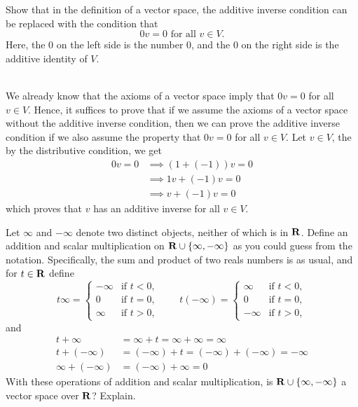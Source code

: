 \begin{exercise}
    Show that in the definition of a vector space, the additive inverse condition can be replaced with the condition that
    $$0v = 0 \text{ for all } v\in V.$$
    Here, the 0 on the left side is the number 0, and the 0 on the right side is the additive identity of $V$.\\
\end{exercise}

\begin{solution}
    \\ We already know that the axioms of a vector space imply that $0v = 0$ for all $v \in V$. Hence, it suffices to prove that if we assume the axioms of a vector space without the additive inverse condition, then we can prove the additive inverse condition if we also assume the property that $0v = 0$ for all $v \in V$. Let $v \in V$, the by the distributive condition, we get
    \begin{align*}
        0v = 0 &\implies (1 + (-1))v = 0 \\
        &\implies 1v + (-1)v = 0 \\
        &\implies v + (-1)v = 0
    \end{align*}
    which proves that $v$ has an additive inverse for all $v \in V$.\\
\end{solution}

\begin{exercise}
    Let $\infty$ and $-\infty$ denote two distinct objects, neither of which is in $\mathbf{R}$. Define an addition and scalar multiplication on $\mathbf{R} \cup \{\infty, -\infty\}$ as you could guess from the notation. Specifically, the sum and product of two reals numbers is as usual, and for $t \in \mathbf{R}$ define 
    $$t\infty = \begin{cases}
        - \infty & \text{if } t < 0,\\
        0 & \text{if } t = 0,\\
        \infty & \text{if } t>0,
    \end{cases} \qquad t(-\infty) = \begin{cases}
        \infty & \text{if } t < 0,\\
        0 & \text{if } t = 0,\\
        -\infty & \text{if } t>0,
    \end{cases}$$
    and
    \begin{align*}
        t + \infty &= \infty + t = \infty + \infty = \infty \\
        t + (-\infty) &= (-\infty) + t = (-\infty) + (-\infty) = -\infty \\
        \infty + (-\infty) &= (-\infty) + \infty = 0
    \end{align*}
    With these operations of addition and scalar multiplication, is $\mathbf{R} \cup \{\infty, -\infty\}$ a vector space over $\mathbf{R}$? Explain. \\
\end{exercise}

